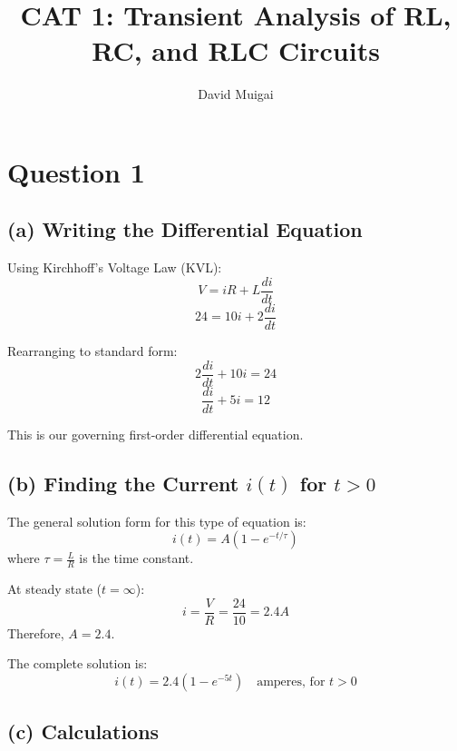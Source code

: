 \documentclass[12pt]{article}
\title{CAT 1: Transient Analysis of RL, RC, and RLC Circuits} %
\author{David Muigai} %
\begin{document}
	
	\maketitle
	
	\section*{Question 1}
	\subsection*{(a) Writing the Differential Equation}
	
	Using Kirchhoff's Voltage Law (KVL):
	\begin{equation}
		V = iR + L \frac{di}{dt}
	\end{equation}
	\begin{equation}
		24 = 10i + 2 \frac{di}{dt}
	\end{equation}
	
	Rearranging to standard form:
	\begin{equation}
		2 \frac{di}{dt} + 10i = 24
	\end{equation}
	\begin{equation}
		\frac{di}{dt} + 5i = 12
	\end{equation}
	
	This is our governing first-order differential equation.
	
	\subsection*{(b) Finding the Current \( i(t) \) for \( t > 0 \)}
	
	The general solution form for this type of equation is:
	\begin{equation}
		i(t) = A(1 - e^{-t/\tau})
	\end{equation}
	where \( \tau = \frac{L}{R} \) is the time constant.
	
	At steady state (\( t = \infty \)):
	\begin{equation}
		i = \frac{V}{R} = \frac{24}{10} = 2.4A
	\end{equation}
	Therefore, \( A = 2.4 \).
	
	The complete solution is:
	\begin{equation}
		i(t) = 2.4(1 - e^{-5t}) \quad \text{amperes, for } t > 0
	\end{equation}
	
	\subsection*{(c) Calculations}
	
\end{document}
